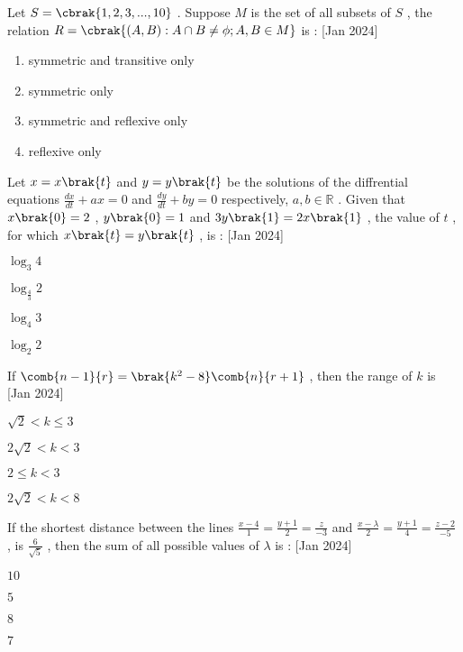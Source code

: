 \item Let $S=\cbrak{1,2,3,...,10}$  . Suppose $ M $ is the set of all subsets of $ S $ , the relation $R=\cbrak{ (A,B):A \cap B \neq \phi ;A,B \in M }$ is : \hfill{[Jan 2024]}
\begin{enumerate}
\item symmetric and transitive only 
\item symmetric only 
\item symmetric and reflexive only 
\item reflexive only 
\end{enumerate}
\item Let $x=x\brak{t}$ and $y=y\brak{t}$ be the solutions of the diffrential equations $\frac{dx}{dt}+ax=0$ and $\frac{dy}{dt}+by=0$ respectively, $a,b \in \mathbb{R}$ . Given that $x\brak{0}=2$ , $y\brak{0}=1$ and $3y\brak{1}=2x\brak{1}$ , the value of $t$ , for which $x\brak{t}=y\brak{t}$ , is :  \hfill{[Jan 2024]}
\begin{enumerate}   
\begin{multicols}{2}
\item $ \log_3 4 $
\item $ \log_{\frac{4}{3}} 2 $
\item $ \log_4 3 $
\item $ \log_2 2 $
\end{multicols}
\end{enumerate}
\item If $\comb{n-1}{r} = \brak{k^2 - 8}\comb{n}{r+1}$ , then the range of $k$ is \hfill{[Jan 2024]}
\begin{enumerate}
\begin{multicols}{2}
\item $ \sqrt{2}<k \leq 3 $
\item $ 2\sqrt{2}<k<3 $
\item $ 2 \leq k<3 $
\item $ 2\sqrt{2}<k<8 $
\end{multicols}
\end{enumerate}
\item If the shortest distance between the lines $ \frac{x-4}{1}=\frac{y+1}{2}=\frac{z}{-3} $ and $ \frac{x-\lambda}{2}=\frac{y+1}{4}=\frac{z-2}{-5} $ , is $\frac{6}{\sqrt{5}}$ , then the sum of all possible values of $\lambda$ is : \hfill{[Jan 2024]}
\begin{enumerate}   
\begin{multicols}{4}
\item $10$
\item $5$
\item $8$
\item $7$                                                                        
\end{multicols}
\end{enumerate}
